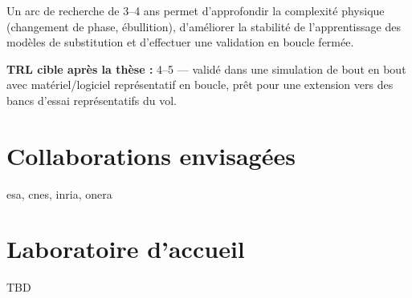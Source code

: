 \documentclass[12pt]{article}
\begin{document}
	Un arc de recherche de 3–4 ans permet d’approfondir la complexité physique (changement de phase, ébullition), d’améliorer la stabilité de l’apprentissage des modèles de substitution et d’effectuer une validation en boucle fermée.
	
	\textbf{TRL cible après la thèse :} 4–5 — validé dans une simulation de bout en bout avec matériel/logiciel représentatif en boucle, prêt pour une extension vers des bancs d’essai représentatifs du vol.
	
	
	\nocite{*}
	
	\printbibliography[title=Bibliographie indicative]
	
	\section*{Collaborations envisagées}
	
	\acrshort{esa}, \acrshort{cnes}, \acrshort{inria}, \acrshort{onera}
	
	\section*{Laboratoire d'accueil}
	
	TBD
	
	\printglossaries
	
\end{document}
